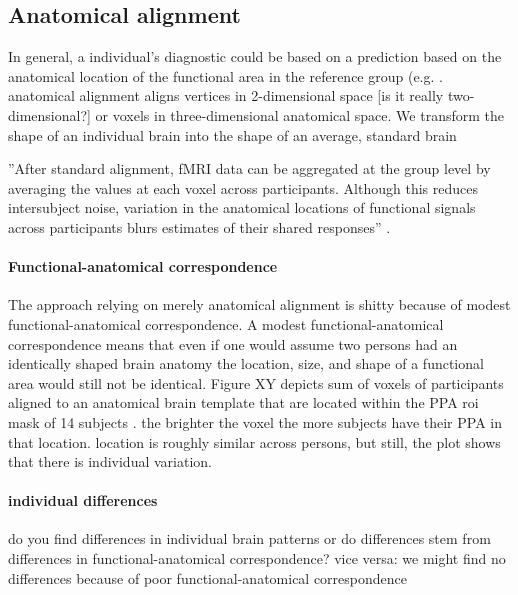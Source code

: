 \subsection{Anatomical alignment}

In general, a individual's diagnostic could be based on a prediction based on
the anatomical location of the functional area in the reference group (e.g.
\citet{weiner2018defining}.
%
anatomical alignment aligns vertices in 2-dimensional space [is it really
two-dimensional?] or voxels in three-dimensional anatomical space.
%
We transform the shape of an individual brain into the shape of an average,
standard brain

%
''After standard alignment, fMRI data can be aggregated at the group level by
averaging the values at each voxel across participants. Although this reduces
intersubject noise, variation in the anatomical locations of functional signals
across participants blurs estimates of their shared responses''
\citep{cohen2017computational}.


\paragraph{Functional-anatomical correspondence}
The approach relying on merely anatomical alignment is shitty because of modest
functional-anatomical correspondence.
A modest functional-anatomical correspondence means that even if one would
assume two persons had an identically shaped brain anatomy the location, size,
and shape of a functional area would still not be identical.
%
Figure XY depicts sum of voxels of participants aligned to an anatomical brain
template that are located within the \ac{PPA} \ac{roi} mask of 14 subjects
\citep{sengupta2016extension}.
%
the brighter the voxel the more subjects have their PPA in that location.
%
location is roughly similar across persons, but still, the plot shows that there
is individual variation.
%

\paragraph{individual differences}

%
do you find differences in individual brain patterns or do differences stem from
differences in functional-anatomical correspondence?
%
vice versa: we might find no differences because of poor functional-anatomical
correspondence


